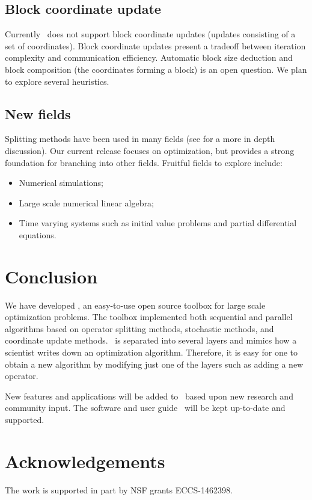 \subsection{Block coordinate update}
  Currently \pkg~does not support block coordinate updates (updates consisting of a set of coordinates). Block coordinate updates present a tradeoff between iteration complexity and communication efficiency.
  Automatic block size deduction and block composition (the coordinates forming a block) is an open question.
We plan to explore several heuristics.

\subsection{New fields}

Splitting methods have been used in many fields (see \citep{roland2016some} for a more in depth discussion).
Our current release focuses on optimization, but provides a strong foundation for branching into other fields.
Fruitful fields to explore include:

\begin{itemize}
\item Numerical simulations;
\item Large scale numerical linear algebra;
\item Time varying systems such as initial value problems and partial differential equations.
\end{itemize}


\section{Conclusion }
We have developed \pkg, an easy-to-use open source toolbox for large scale optimization problems.
The toolbox implemented both sequential and parallel algorithms based on operator splitting methods, stochastic methods,
and coordinate update methods. \pkg~is separated into several layers and mimics how a scientist writes down an optimization algorithm. Therefore, it is easy for one to obtain a new algorithm by modifying just one of the layers such as adding a new operator.


New features and applications will be added to \pkg~based upon new research and community input. The software and user guide \repo~will be kept up-to-date and supported.

\section{Acknowledgements}
The work is supported in part by NSF grants ECCS-1462398.